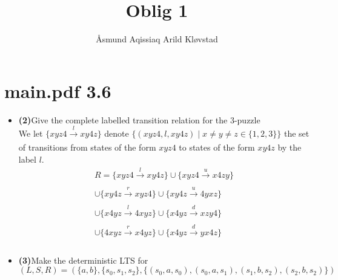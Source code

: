 \documentclass[defaultpackages]{simplereport}
\title{Oblig 1}
\author{Åsmund Aqissiaq Arild Kløvstad}
\begin{document}
\maketitle{}
\section*{main.pdf 3.6}
\begin{itemize}[label=]
\item \textbf{(2)}Give the complete labelled transition relation for the 3-puzzle\\
We let $\{xyz4 \xrightarrow[]{l} xy4z\}$ denote $\{(xyz4,
l, xy4z) \mid x \not= y \not= z \in \{1,2,3\}\}$ the set of transitions from
states of the form $xyz4$ to states of the form $xy4z$ by the label $l$. 
\begin{equation*}
  \begin{split}
R = \{xyz4 \xrightarrow[]{l} xy4z\} \cup \{xyz4 \xrightarrow[]{u} x4zy\}\\
\cup \{xy4z \xrightarrow[]{r} xyz4\} \cup \{xy4z \xrightarrow[]{u} 4yxz\}\\
\cup \{x4yz \xrightarrow[]{l} 4xyz\} \cup \{x4yz \xrightarrow[]{d} xzy4\}\\
\cup \{4xyz \xrightarrow[]{r} x4yz\} \cup \{x4yz \xrightarrow[]{d} yx4z\}\\
\end{split}
\end{equation*}

\item \textbf{(3)}Make the deterministic LTS for $(L, S, R) = (\{a, b\}, \{s_0, s_1, s_2\},
  \{(s_0, a, s_0), (s_0, a, s_1), (s_1, b, s_2), (s_2, b, s_2)\})$\\
\begin{figure}[H]
  \centering
{}
\hspace{30pt}\hspace{30pt}
\end{figure}
\end{itemize}
\end{document}
